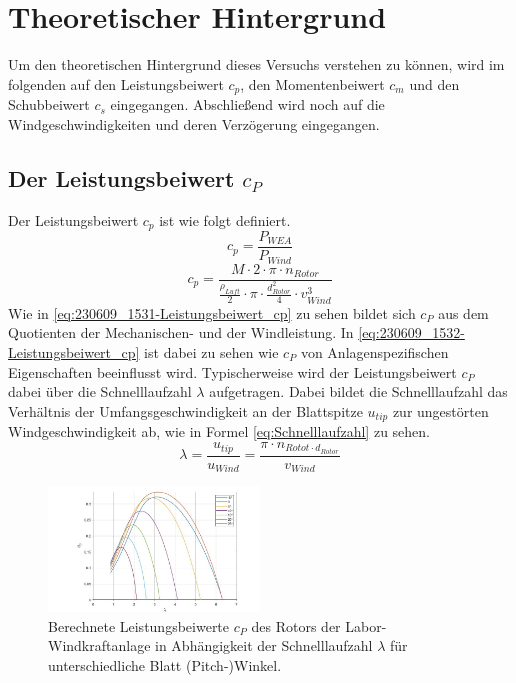 \section{Theoretischer Hintergrund}
Um den theoretischen Hintergrund dieses Versuchs verstehen zu können, wird im folgenden auf den Leistungsbeiwert $c_{p}$, den Momentenbeiwert $c_{m}$ und den Schubbeiwert $c_{s}$ eingegangen. Abschließend wird noch auf die Windgeschwindigkeiten und deren Verzögerung eingegangen.
\subsection{Der Leistungsbeiwert \texorpdfstring{$c_P$}{}}
Der Leistungsbeiwert $c_{p}$ ist wie folgt definiert.
\begin{equation}
  c_{p}= \frac{P_{WEA}}{P_{Wind}}
    \label{eq:230609_1531-Leistungsbeiwert_cp}
\end{equation}
\begin{equation}
  c_{p}= \frac{M \cdot 2 \cdot \pi \cdot n_{Rotor}}{\frac{\rho_{Luft}}{2}\cdot \pi \cdot \frac{d^2_{Rotor}}{4} \cdot v^3_{Wind} }
    \label{eq:230609_1532-Leistungsbeiwert_cp}
\end{equation}
Wie in \autoref{eq:230609_1531-Leistungsbeiwert_cp} zu sehen bildet sich $c_P$ aus dem Quotienten der Mechanischen- und der Windleistung. 
In \autoref{eq:230609_1532-Leistungsbeiwert_cp} ist dabei zu sehen wie $c_P$ von Anlagenspezifischen Eigenschaften beeinflusst wird.
Typischerweise wird der Leistungsbeiwert $c_P$ dabei über die Schnelllaufzahl $\lambda$ aufgetragen. Dabei bildet die Schnelllaufzahl das Verhältnis der Umfangsgeschwindigkeit an der Blattspitze $u_{tip}$ zur ungestörten Windgeschwindigkeit ab, wie in Formel \ref{eq:Schnelllaufzahl} zu sehen.
\begin{equation}
\lambda=\frac{u_{tip}}{u_{Wind}}=\frac{\pi \cdot n_{Rotot \cdot d_{Rotor}}}{v_{Wind}}
    \label{eq:Schnelllaufzahl}
\end{equation}

\begin{figure}[h!]
    \centering
    \includegraphics[width=0.5\textwidth]{Abbildungen/cpzulambda.jpg}
    \caption{Berechnete Leistungsbeiwerte $c_P$ des Rotors der Labor-Windkraftanlage in Abhängigkeit der Schnelllaufzahl $\lambda$ für unterschiedliche Blatt (Pitch-)Winkel.\cite{Anleitung}}
    \label{fig:cpzulambda}
\end{figure}

